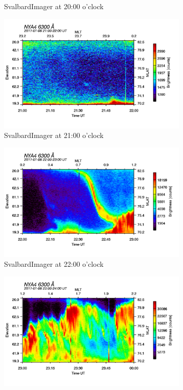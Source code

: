 \documentclass[10pt,a4paper]{article}
\begin{document}
\begin{figure}[h]
\begin{subfigure}{0.3\textwidth}
	\caption{ SvalbardImager at 20:00 o'clock \label{SBI_6_20}}
\end{subfigure}
\begin{subfigure}{0.3\textwidth}
\centering
	\includegraphics[width=\textwidth]{SvalbardImager6300A21.png}
	\caption{ SvalbardImager at 21:00 o'clock \label{SBI_6_21}}
\end{subfigure}
\begin{subfigure}{0.3\textwidth}
\centering
		\includegraphics[width=\textwidth]{SvalbardImager6300A22.png}
	\caption{ SvalbardImager at 22:00 o'clock \label{SBI_6_22}}
\end{subfigure}
\begin{subfigure}{0.3\textwidth}
\centering
	\includegraphics[width=\textwidth]{SvalbardImager6300A23.png}

\end{subfigure}
\end{figure}
\end{document}
